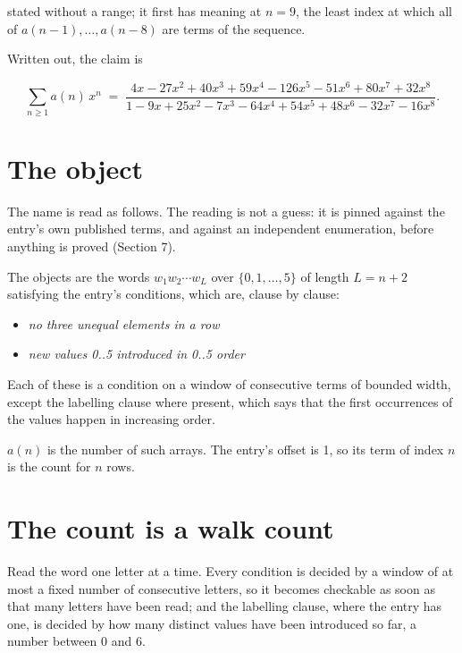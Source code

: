 \documentclass[11pt]{article}
\theoremstyle{definition}
\begin{document}
stated without a range; it first has meaning at $n = 9$, the least index at which all of $a(n-1),\dots,a(n-8)$ are terms of the sequence.

Written out, the claim is

\[\sum_{n \ge 1} a(n)\,x^n \;=\; \frac{4x - 27x^{2} + 40x^{3} + 59x^{4} - 126x^{5} - 51x^{6} + 80x^{7} + 32x^{8}}{1 - 9x + 25x^{2} - 7x^{3} - 64x^{4} + 54x^{5} + 48x^{6} - 32x^{7} - 16x^{8}}.\]

\section{The object}

The name is read as follows. The reading is not a guess: it is pinned against the entry's own published terms, and against an independent enumeration, before anything is proved (Section 7).

The objects are the words $w_1 w_2 \cdots w_L$ over $\{0,1,\dots,5\}$ of length $L = n + 2$ satisfying the entry's conditions, which are, clause by clause:

\begin{itemize}

\item {\itshape no three unequal elements in a row}

\item {\itshape new values 0..5 introduced in 0..5 order}

\end{itemize}

Each of these is a condition on a window of consecutive terms of bounded width, except the labelling clause where present, which says that the first occurrences of the values happen in increasing order.

$a(n)$ is the number of such arrays. The entry's offset is 1, so its term of index $n$ is the count for $n$ rows.

\section{The count is a walk count}

Read the word one letter at a time. Every condition is decided by a window of at most a fixed number of consecutive letters, so it becomes checkable as soon as that many letters have been read; and the labelling clause, where the entry has one, is decided by how many distinct values have been introduced so far, a number between $0$ and 6.
\end{document}
